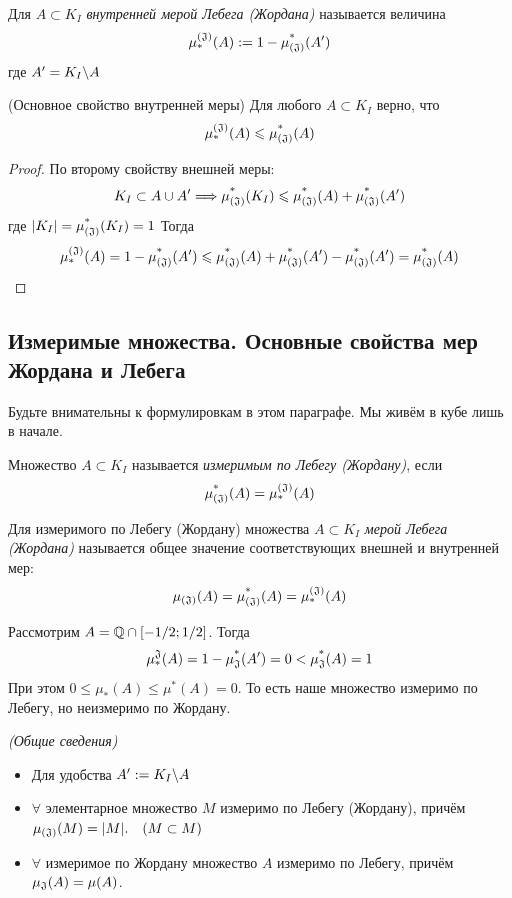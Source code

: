 \begin{definition}
	Для $A \subset K_I$ \textit{внутренней мерой Лебега (Жордана)} называется величина
	\[
		\operatorname{\mu^{(\mathfrak{J})}_*}(A) := 1 - \operatorname{\mu^*_{(\mathfrak{J})}}(A')
	\]
	где $A' = K_I \backslash A$
\end{definition}

\begin{theorem} (Основное свойство внутренней меры)
	Для любого $A \subset K_I$ верно, что
	\[
		\operatorname{\mu^{(\mathfrak{J})}_*}(A) \leqslant \operatorname{\mu^*_{(\mathfrak{J})}}(A)
	\]
\end{theorem}

\begin{proof}
	По второму свойству внешней меры:
	\[
		K_I \subset A \cup A' \Longrightarrow \operatorname{\mu^*_{(\mathfrak{J})}}(K_I) \leqslant \operatorname{\mu^*_{(\mathfrak{J})}}(A) + \operatorname{\mu^*_{(\mathfrak{J})}}(A')
	\]
	где $|K_I| = \operatorname{\mu^*_{(\mathfrak{J})}}(K_I) = 1$
	Тогда
	\[
		\operatorname{\mu^{(\mathfrak{J})}_*}(A) = 1 - \operatorname{\mu^*_{(\mathfrak{J})}}(A')\leqslant \operatorname{\mu^*_{(\mathfrak{J})}}(A) + \operatorname{\mu^*_{(\mathfrak{J})}}(A') - \operatorname{\mu^*_{(\mathfrak{J})}}(A') = 
		 \operatorname{\mu^*_{(\mathfrak{J})}}(A)
	\]
\end{proof}

\subsection{Измеримые множества. Основные свойства мер Жордана и Лебега}

\begin{note}
	Будьте внимательны к формулировкам в этом параграфе. Мы живём в кубе лишь в начале.
\end{note}

\begin{definition}
	Множество $A \subset K_I$ называется \textit{измеримым по Лебегу (Жордану)}, если
	\[
		\operatorname{\mu^*_{(\mathfrak{J})}}(A) = \operatorname{\mu^{(\mathfrak{J})}_*}(A)
	\]
\end{definition}

\begin{definition}
	Для измеримого по Лебегу (Жордану) множества $A \subset K_I$ \textit{мерой Лебега (Жордана)} называется общее значение соответствующих внешней и внутренней мер:
	\[
		\operatorname{\mu_{(\mathfrak{J})}}(A) = \operatorname{\mu^*_{(\mathfrak{J})}}(A) = \operatorname{\mu^{(\mathfrak{J})}_*}(A)
	\]
\end{definition}

\begin{example}
	Рассмотрим $A = \mathbb{Q} \cap [-1/2; 1/2]$. Тогда
	\[
		\operatorname{\mu^\mathfrak{J}_*}(A) = 1 - \operatorname{\mu^*_\mathfrak{J}}(A') = 0 < \operatorname{\mu^*_\mathfrak{J}}(A) = 1
	\]
	При этом $0 \le \mu_*(A) \le \mu^*(A) = 0$. То есть наше множество измеримо по Лебегу, но неизмеримо по Жордану.
\end{example}

\begin{note}\textit{(Общие сведения)}
	\begin{itemize}
		\item Для удобства $A':= K_I\backslash A$
		\item $\forall$ элементарное множество $M$ измеримо по Лебегу (Жордану), причём $\operatorname{\mu_{(\mathfrak{J})}}(M) = |M|.\quad (M\subset M)$
		\item $\forall$ измеримое по Жордану множество $A$ измеримо по Лебегу, причём $\operatorname{\mu_\mathfrak{J}}(A)=\mu(A)$.
	\end{itemize}
\end{note}

